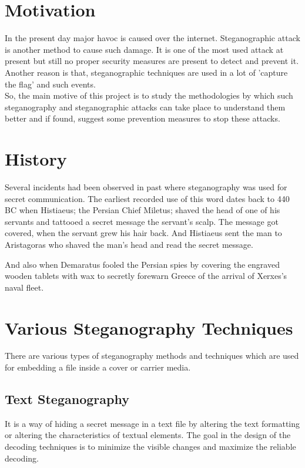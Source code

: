 \documentclass[12ptpt,conference]{IEEEtran}
\begin{document}
\section {Motivation} \label { sec:motive }
\noindent In the present day major havoc is caused over the internet. Steganographic attack is another method to cause such damage. It is one of the most used attack at present but still no proper security measures are present to detect and prevent it. 
\\
Another reason is that, steganographic techniques are used in a lot of 'capture the flag' and such events.
\\
So, the main motive of this project is to study the methodologies by which such steganography and steganographic attacks can take place to understand them better and if found, suggest some prevention measures to stop these attacks.


\section {History} \label {sec:hist}
\noindent Several incidents had been observed in past where steganography was used for secret communication.
\noindent The earliest recorded use of this word dates back to 440 BC when Histiaeus; the Persian Chief Miletus; shaved the head of one of his servants and tattooed a secret message the servant’s scalp. The message got covered, when the servant grew his hair back. And Histiaeus sent the man to Aristagoras who shaved the man’s head and read the secret message.

\noindent And also when Demaratus fooled the Persian spies by covering the engraved wooden tablets with wax to secretly forewarn Greece of the arrival of Xerxes’s naval fleet.

\section {Various Steganography Techniques} \label {sec:technq}
\noindent There are various types of steganography methods and
techniques which are used for embedding a file inside a cover or
carrier media.



\subsection{Text Steganography}
It is a way of hiding a secret message in a text file by altering the text formatting or altering the characteristics of textual elements.
The goal in the design of the decoding techniques is to minimize the visible changes and maximize the reliable decoding. 
\end{document}
